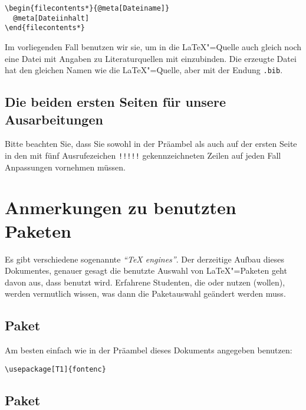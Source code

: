 \begin{tcolorbox}
\begin{Verbatim}[commandchars=\@\[\]]
\begin{filecontents*}{@meta[Dateiname]}
  @meta[Dateiinhalt]
\end{filecontents*}
\end{Verbatim}
\end{tcolorbox}

Im vorliegenden Fall benutzen wir sie, um in die \LaTeX"=Quelle auch gleich
noch eine Datei mit Angaben zu Literaturquellen mit einzubinden.
%
Die erzeugte Datei hat den gleichen Namen wie die \LaTeX"=Quelle, aber mit der
Endung \verb|.bib|.


\subsection{Die beiden ersten Seiten für unsere Ausarbeitungen}


Bitte beachten Sie, dass Sie sowohl in der Präambel als auch auf der ersten
Seite in den mit fünf Ausrufezeichen \texttt{!!!!!} gekennzeichneten Zeilen
auf jeden Fall Anpassungen vornehmen müssen.


\section{Anmerkungen zu benutzten Paketen}
\label{sec:benutzte-pakete}

Es gibt verschiedene sogenannte \emph{"`\TeX{} engines"'}.
%
Der derzeitige Aufbau dieses Dokumentes, genauer gesagt die benutzte Auswahl
von \LaTeX"=Paketen geht davon aus, dass  benutzt wird.
%
Erfahrene Studenten, die  oder 
nutzen (wollen), werden vermutlich wissen, was dann die Paketauswahl
geändert werden muss.

\subsection{Paket }

Am besten einfach wie in der Präambel dieses Dokuments angegeben benutzen:

\verb|\usepackage[T1]{fontenc}|

\subsection{Paket }

